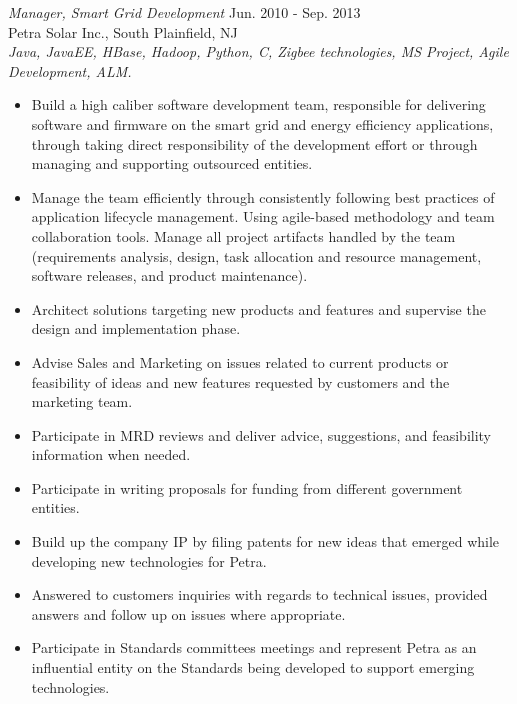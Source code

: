 \documentclass[line,margin]{res}
\begin{document}
\begin{resume}
{\sl Manager, Smart Grid Development} \hfill        Jun. 2010 - Sep. 2013  \\
Petra Solar Inc., South Plainfield, NJ \\
  \textit{Java, JavaEE, HBase, Hadoop, Python, C, Zigbee technologies, MS
  Project, Agile Development, ALM.}
  \begin{itemize} \itemsep -2pt %
      \item  Build a high caliber software development team, responsible for
      delivering software and firmware on the
      smart grid and energy efficiency applications, through taking direct
      responsibility of the development effort or through managing and
      supporting outsourced entities.
      \item  Manage the team efficiently through consistently following best
      practices of application lifecycle management.  Using agile-based
      methodology and team collaboration tools. Manage all project artifacts
      handled by the team (requirements analysis, design, task allocation and
      resource management, software releases, and product maintenance).
      \item  Architect solutions targeting new products and features and
      supervise the design and implementation phase.
      \item  Advise Sales and Marketing on issues related to current products
      or feasibility of ideas and new features requested by customers and
      the marketing team.
      \item  Participate in MRD reviews and deliver advice, suggestions, and
      feasibility information when needed.
      \item  Participate in writing proposals for funding from different
      government entities.
      \item  Build up the company IP by filing patents for new ideas that
      emerged while developing new technologies for Petra.
      \item  Answered to customers inquiries with regards to technical issues,
      provided answers and follow up on issues where appropriate.
      \item  Participate in Standards committees meetings and represent Petra as
      an influential entity on the Standards being developed to support emerging
      technologies.
 \end{itemize}
 

\end{resume}
\end{document}
